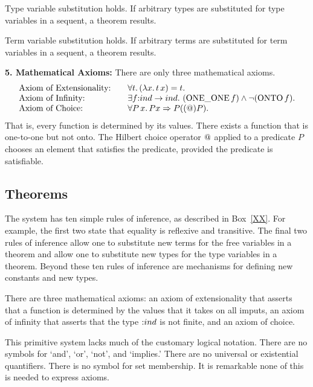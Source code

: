 \documentclass{llncs}
\def\op#1{{\hbox{#1}}} %
\def\tc{\hbox{:}}
\begin{document}
{{Type variable substitution holds.  If arbitrary types are substituted for type variables in a sequent, a theorem results.

Term variable substitution holds.  If arbitrary terms are substituted for term variables in a sequent, a theorem results.



\bigskip
{\bf 5. Mathematical Axioms:} There are only three mathematical axioms.
$$\begin{array}{lll}
\hbox{Axiom of Extensionality:} &\quad\forall t.\, (\lambda x.\, t\, x) = t.\\
\hbox{Axiom of Infinity:} &\quad\exists f\tc ind\to ind.\ (\op{ONE\_ONE}\,f) \land \neg(\op{ONTO}\, f).\\
\hbox{Axiom of Choice:}&\quad  \forall P\,x.\, P x \Rightarrow  P((\hbox{@}) P).\\
\end{array}
$$
That is, every function is determined by its values. There exists a function that is one-to-one but not onto.  The Hilbert choice operator $\hbox{@}$ applied to a predicate $P$ chooses an element that satisfies the predicate, provided the
predicate is satisfiable.


}} %
\bigskip

\subsection{Theorems}


The system has ten simple rules of inference, as described in Box~\ref{XX}.
For example, the first two state that equality is reflexive and transitive.
The final two rules
of inference allow one to substitute new terms for the free
variables in a theorem and  allow one to substitute new types for the
type variables in a theorem.  Beyond these ten rules of inference are mechanisms for
defining new constants and  new types.

There are three mathematical axioms: an axiom of extensionality that asserts
that a function is determined by the values that it takes on all imputs,
an axiom of infinity that asserts that the type $\tc ind$ is not finite, and an axiom of choice.

This primitive system 
lacks much of the customary logical notation.
There are no symbols for %
`and', `or', `not', and `implies.'  There are no universal or existential quantifiers.  There is no symbol for set membership.  
It is remarkable none of this is needed to express axioms.
\end{document}
